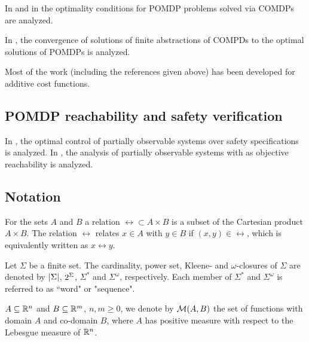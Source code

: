 \documentclass{ifacconf}
\begin{document}
In \cite{feinberg2016partially} and in \cite{feinberg2014optimality} the optimality conditions for POMDP problems solved via COMDPs are analyzed. 

In \cite{saldi2017finite}, the convergence of solutions of finite abstractions of COMPDs to the optimal solutions of POMDPs is analyzed. 


Most of the work (including the references given above) has been developed for additive cost functions. 


\subsection{POMDP reachability and safety verification}

In \cite{ding2013optimal}, the optimal control of partially observable systems over safety specifications is analyzed. 
In \cite{LESSER20141989}, the analysis of partially observable systems with as objective reachability is analyzed. 


\subsection{Notation}

For the sets $A$ and $B$ a relation $\rel\subset A\times B$ is a subset of the Cartesian product $A\times B$. The relation $\rel$ relates $x\in A$ with $y\in B$ if $(x,y)\in\rel$, which is equivalently written as $x\rel y$.




    Let $\Sigma$ be a finite set. The cardinality,
    power set, Kleene- and $\omega$-closures
    of $\Sigma$ are denoted by $\left| {\Sigma} \right|$,
    $2^{\Sigma}$, $\Sigma^*$ and $\Sigma^\omega$,
    respectively.    
    Each member of $\Sigma^*$ and $\Sigma^\omega$ is referred to as ``word" or "sequence". 
    
    
    $A \subseteq \mathbb{R}^n$ and $B \subseteq \mathbb{R}^m$,
    $n, m \geq 0$, we denote by $\mathcal{M}(A, B)$ the set of
    functions with domain $A$ and co-domain $B$, where $A$ has positive measure with
    respect to the Lebesgue measure of $\mathbb{R}^n$.
    
\end{document}
